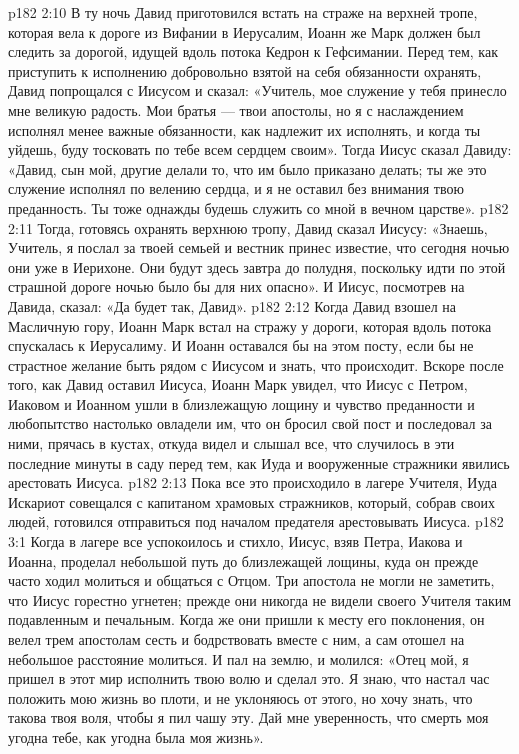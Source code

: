\vs p182 2:10 \pc В ту ночь Давид приготовился встать на страже на верхней тропе, которая вела к дороге из Вифании в Иерусалим, Иоанн же Марк должен был следить за дорогой, идущей вдоль потока Кедрон к Гефсимании. Перед тем, как приступить к исполнению добровольно взятой на себя обязанности охранять, Давид попрощался с Иисусом и сказал: «Учитель, мое служение у тебя принесло мне великую радость. Мои братья --- твои апостолы, но я с наслаждением исполнял менее важные обязанности, как надлежит их исполнять, и когда ты уйдешь, буду тосковать по тебе всем сердцем своим». Тогда Иисус сказал Давиду: «Давид, сын мой, другие делали то, что им было приказано делать; ты же это служение исполнял по велению сердца, и я не оставил без внимания твою преданность. Ты тоже однажды будешь служить со мной в вечном царстве».
\vs p182 2:11 Тогда, готовясь охранять верхнюю тропу, Давид сказал Иисусу: «Знаешь, Учитель, я послал за твоей семьей и вестник принес известие, что сегодня ночью они уже в Иерихоне. Они будут здесь завтра до полудня, поскольку идти по этой страшной дороге ночью было бы для них опасно». И Иисус, посмотрев на Давида, сказал: «Да будет так, Давид».
\vs p182 2:12 \pc Когда Давид взошел на Масличную гору, Иоанн Марк встал на стражу у дороги, которая вдоль потока спускалась к Иерусалиму. И Иоанн оставался бы на этом посту, если бы не страстное желание быть рядом с Иисусом и знать, что происходит. Вскоре после того, как Давид оставил Иисуса, Иоанн Марк увидел, что Иисус с Петром, Иаковом и Иоанном ушли в близлежащую лощину и чувство преданности и любопытство настолько овладели им, что он бросил свой пост и последовал за ними, прячась в кустах, откуда видел и слышал все, что случилось в эти последние минуты в саду перед тем, как Иуда и вооруженные стражники явились арестовать Иисуса.
\vs p182 2:13 \pc Пока все это происходило в лагере Учителя, Иуда Искариот совещался с капитаном храмовых стражников, который, собрав своих людей, готовился отправиться под началом предателя арестовывать Иисуса.
\vs p182 3:1 Когда в лагере все успокоилось и стихло, Иисус, взяв Петра, Иакова и Иоанна, проделал небольшой путь до близлежащей лощины, куда он прежде часто ходил молиться и общаться с Отцом. Три апостола не могли не заметить, что Иисус горестно угнетен; прежде они никогда не видели своего Учителя таким подавленным и печальным. Когда же они пришли к месту его поклонения, он велел трем апостолам сесть и бодрствовать вместе с ним, а сам отошел на небольшое расстояние молиться. И пал на землю, и молился: «Отец мой, я пришел в этот мир исполнить твою волю и сделал это. Я знаю, что настал час положить мою жизнь во плоти, и не уклоняюсь от этого, но хочу знать, что такова твоя воля, чтобы я пил чашу эту. Дай мне уверенность, что смерть моя угодна тебе, как угодна была моя жизнь».
